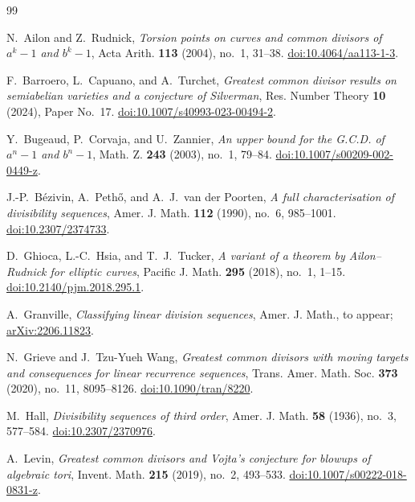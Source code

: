\documentclass[11pt]{amsart}
\theoremstyle{remark}
\numberwithin{equation}{section}
\begin{document}
\begin{thebibliography}{99}

N.~Ailon and Z.~Rudnick,
\emph{Torsion points on curves and common divisors of $a^k-1$ and $b^k-1$},
Acta Arith. \textbf{113} (2004), no.~1, 31--38.
\href{https://doi.org/10.4064/aa113-1-3}{doi:10.4064/aa113-1-3}.

F.~Barroero, L.~Capuano, and A.~Turchet,
\emph{Greatest common divisor results on semiabelian varieties and a conjecture of Silverman},
Res. Number Theory \textbf{10} (2024), Paper No.~17.
\href{https://doi.org/10.1007/s40993-023-00494-2}{doi:10.1007/s40993-023-00494-2}.

Y.~Bugeaud, P.~Corvaja, and U.~Zannier,
\emph{An upper bound for the G.C.D. of $a^n-1$ and $b^n-1$},
Math. Z. \textbf{243} (2003), no.~1, 79--84.
\href{https://doi.org/10.1007/s00209-002-0449-z}{doi:10.1007/s00209-002-0449-z}.

J.-P.~B\'ezivin, A.~Peth\H{o}, and A.~J.~van der Poorten,
\emph{A full characterisation of divisibility sequences},
Amer. J. Math. \textbf{112} (1990), no.~6, 985--1001.
\href{https://doi.org/10.2307/2374733}{doi:10.2307/2374733}.

D.~Ghioca, L.-C.~Hsia, and T.~J.~Tucker,
\emph{A variant of a theorem by Ailon--Rudnick for elliptic curves},
Pacific J. Math. \textbf{295} (2018), no.~1, 1--15.
\href{https://doi.org/10.2140/pjm.2018.295.1}{doi:10.2140/pjm.2018.295.1}.

A.~Granville,
\emph{Classifying linear division sequences},
Amer. J. Math., to appear;
\href{https://arxiv.org/abs/2206.11823}{arXiv:2206.11823}.

N.~Grieve and J.~Tzu-Yueh Wang,
\emph{Greatest common divisors with moving targets and consequences for linear recurrence sequences},
Trans. Amer. Math. Soc. \textbf{373} (2020), no.~11, 8095--8126.
\href{https://doi.org/10.1090/tran/8220}{doi:10.1090/tran/8220}.

M.~Hall,
\emph{Divisibility sequences of third order},
Amer. J. Math. \textbf{58} (1936), no.~3, 577--584.
\href{https://doi.org/10.2307/2370976}{doi:10.2307/2370976}.

A.~Levin,
\emph{Greatest common divisors and Vojta's conjecture for blowups of algebraic tori},
Invent. Math. \textbf{215} (2019), no.~2, 493--533.
\href{https://doi.org/10.1007/s00222-018-0831-z}{doi:10.1007/s00222-018-0831-z}.


\end{thebibliography}
\end{document}
